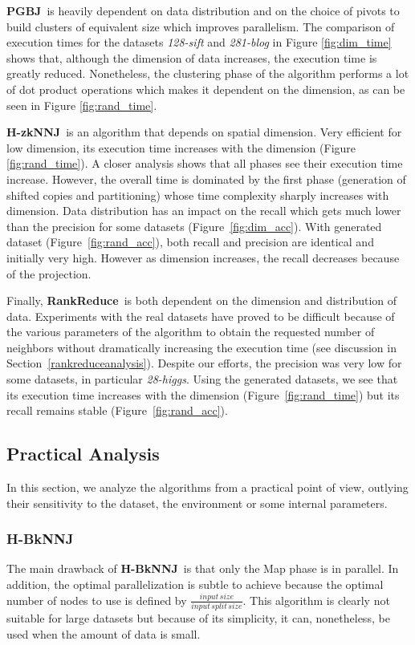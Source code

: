 \documentclass[10pt,journal,compsoc]{IEEEtran}
\newcommand{\Z}{{\bf H-zkNNJ}}
\newcommand{\LSH}{{\bf RankReduce}}
\newcommand{\VO}{{\bf PGBJ}}
\newcommand{\HBK}{{\bf H-BkNNJ}}
\begin{document}
\VO~is heavily dependent on data distribution and on the choice of pivots to build clusters of 
equivalent size which improves parallelism. The comparison of execution times for the datasets 
\emph{128-sift} and \emph{281-blog} in Figure \ref{fig:dim_time} shows that, although the dimension
of data increases, the execution time is greatly reduced. Nonetheless, the clustering phase of the algorithm performs a 
lot of dot product operations which makes it dependent on the dimension, as can be seen in Figure \ref{fig:rand_time}. 

\Z~is an algorithm that depends on spatial dimension. Very efficient for low dimension, its 
execution time increases with the dimension (Figure \ref{fig:rand_time}). A closer 
analysis shows that all phases see their execution time increase. However, the overall time is 
dominated by the first phase (generation of shifted copies and partitioning) whose time complexity
sharply increases with dimension. Data distribution has 
an impact on the recall which gets much lower than the precision for some datasets (Figure~\ref{fig:dim_acc}).
With generated dataset (Figure~\ref{fig:rand_acc}), both recall and precision are identical and initially very high. 
However as dimension increases, the recall decreases because of the projection. 

Finally, \LSH~is both dependent on the dimension and distribution of data. Experiments with the real datasets have 
proved to be difficult because of the various parameters of the algorithm to obtain the requested number of 
neighbors without dramatically increasing the execution time (see discussion in Section~\ref{rankreduceanalysis}). 
Despite our efforts, the precision was very low for some datasets, in particular \emph{28-higgs}. 
Using the generated datasets, we see that its execution time increases with the dimension (Figure~\ref{fig:rand_time}) 
but its recall remains stable (Figure~\ref{fig:rand_acc}). 

\subsection{Practical Analysis}
In this section, we analyze the algorithms from a practical point of view, outlying their sensitivity to 
the dataset, the environment or some internal parameters.   
\subsubsection{H-BkNNJ}
The main drawback of \HBK~is that only the Map phase is in parallel. In addition, the optimal parallelization 
is subtle to achieve because the optimal number of nodes to use is defined by  
$\frac{input\,size}{input\,split\,size}$. This algorithm is clearly not suitable for large datasets but because of its 
simplicity, it can, nonetheless, be used when the amount of data is small.  
\end{document}
